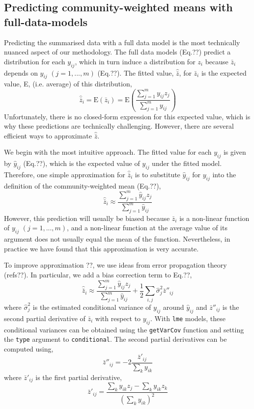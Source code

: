 \documentclass[12pt]{ecologyFORAPPENDIX}
\begin{document}
\subsection{Predicting community-weighted means with full-data-models}

Predicting the summarised data with a full data model is the most technically nuanced aspect of our methodology.  The full data models (Eq.??) predict a distribution for each $y_{ij}$, which in turn induce a distribution for $z_i$ because $\bar{z}_i$ depends on $y_{ij}$ $(j = 1,...,m)$ (Eq.??).  The fitted value, $\hat{\bar{z}}$, for $\bar{z}_i$ is the expected value, E, (i.e. average) of this distribution,
\begin{equation}
\hat{\bar{z}}_i = \mathrm{E}(\bar{z}_i) = \mathrm{E}\left(\frac{\sum_{j=1}^m y_{ij} z_j}{\sum_{j=1}^m y_{ij}} \right)
\end{equation}
Unfortunately, there is no closed-form expression for this expected value, which is why these predictions are technically challenging.  However, there are several efficient ways to approximate $\hat{\bar{z}}$.

We begin with the most intuitive approach.  The fitted value for each $y_{ij}$ is given by $\hat{y}_{ij}$ (Eq.??), which is the expected value of $y_{ij}$ under the fitted model.  Therefore, one simple approximation for $\hat{\bar{z}}_i$ is to substitute $\hat{y}_{ij}$ for $y_{ij}$ into the definition of the community-weighted mean (Eq.??),
\begin{equation}
\hat{\bar{z}}_i \approx \frac{\sum_{j=1}^m \hat{y}_{ij} z_j}{\sum_{j=1}^m \hat{y}_{ij}}
\end{equation}
However, this prediction will usually be biased because $\bar{z}_i$ is a non-linear function of $y_{ij}$ $(j = 1,...,m)$, and a non-linear function at the average value of its argument does not usually equal the mean  of the function.  Nevertheless, in practice we have found that this approximation is very accurate.

To improve approximation ??, we use ideas from error propagation theory (refs??).  In particular, we add a bias correction term to Eq.??,
\begin{equation}
\hat{\bar{z}}_i \approx \frac{\sum_{j=1}^m \hat{y}_{ij} z_j}{\sum_{j=1}^m \hat{y}_{ij}} + \frac{1}{2} \sum_{i, j} \hat{\sigma}_j^2 \bar{z}''_{ij}
\end{equation}
where $\hat{\sigma}_j^2$ is the estimated conditional variance of $y_{ij}$ around $\hat{y}_{ij}$ and $\bar{z}''_{ij}$ is the second partial derivative of $\bar{z}_i$ with respect to $y_{ij}$.  With \texttt{lme} models, these conditional variances can be obtained using the \texttt{getVarCov} function and setting the \texttt{type} argument to \texttt{conditional}.  The second partial derivatives can be computed using,
\begin{equation}
\bar{z}''_{ij} = -2 \frac{\bar{z}'_{ij}}{\sum_k y_{ik}}
\end{equation}
where $\bar{z}'_{ij}$ is the first partial derivative,
\begin{equation}
\bar{z}'_{ij} = \frac{\sum_k y_{ik} z_j - \sum_k y_{ik} z_k}{\left( \sum_k y_{ik} \right)^2}
\end{equation}
\end{document}
